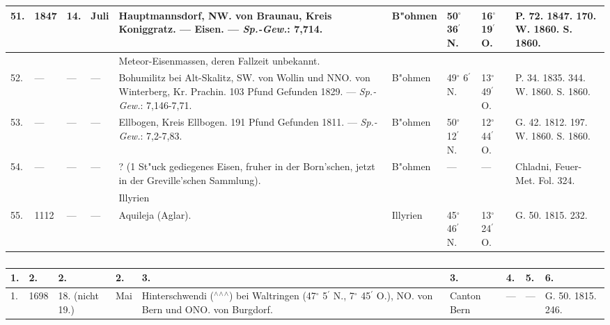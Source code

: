 \documentclass[a4paper, 8pt, oneside, polutonikogreek, german]{article}
\begin{document}
\begin{center}
\begin{longtable}{|p{3mm}|p{10mm}|p{5mm}|p{13mm}|p{25mm}|p{13mm}|p{10mm}|p{10mm}|p{11mm}|}
        51. & 1847 & 14. & Juli & Hauptmannsdorf, NW. von Braunau, Kreis Koniggratz. --- Eisen. --- \emph{Sp.-Gew.}: 7,714. & B"ohmen & 50$^\circ$ 36$^\prime$ N. & 16$^\circ$ 19$^\prime$ O. & P. 72. 1847. 170. W. 1860. S. 1860. \\ \hline
          &   &   &   & Meteor-Eisenmassen, deren Fallzeit unbekannt. &   &   &   & ~ \\ \hline
        52. & --- & --- & --- & Bohumilitz bei Alt-Skalitz, SW. von Wollin und NNO. von Winterberg, Kr. Prachin. 103 Pfund Gefunden 1829. --- \emph{Sp.-Gew.}: 7,146-7,71. & B"ohmen & 49$^\circ$ 6$^\prime$ N. & 13$^\circ$ 49$^\prime$ O. & P. 34. 1835. 344. W. 1860. S. 1860. \\ \hline
        53. & --- & --- & --- & Ellbogen, Kreis Ellbogen. 191 Pfund Gefunden 1811. --- \emph{Sp.-Gew.}: 7,2-7,83. & B"ohmen & 50$^\circ$ 12$^\prime$ N. & 12$^\circ$ 44$^\prime$ O. & G. 42. 1812. 197. W. 1860. S. 1860. \\ \hline
        54. & --- & --- & --- & ? (1 St"uck gediegenes Eisen, fruher in der Born’schen, jetzt in der Greville’schen Sammlung). & B"ohmen & --- & --- & Chladni, Feuer-Met. Fol. 324. \\ \hline
         &   &   &  & Illyrien &   &   &   &   \\ \hline
        55. & 1112 & --- & --- & Aquileja (Aglar). & Illyrien & 45$^\circ$ 46$^\prime$ N. & 13$^\circ$ 24$^\prime$ O. & G. 50. 1815. 232. \\ \hline
    \end{longtable}
\end{center}
\subsubsection{}
\begin{table}[H]
    \footnotesize
    \frakfamily
    \begin{longtable}{|p{3mm}|p{10mm}|p{5mm}|p{13mm}|p{25mm}|p{13mm}|p{10mm}|p{10mm}|p{11mm}|}
    \hline
        1. & 2. & 2. & 2. & 3. & 3. & 4. & 5. & 6. \\ \hline
        1. & 1698 & 18. (nicht 19.) & Mai & Hinterschwendi ($^\wedge$$^\wedge$$^\wedge$) bei Waltringen (47$^\circ$ 5$^\prime$ N., 7$^\circ$ 45$^\prime$ O.), NO. von Bern und ONO. von Burgdorf. & Canton Bern & --- & --- & G. 50. 1815. 246. \\ \hline
    \end{longtable}
\end{table}
\end{document}
